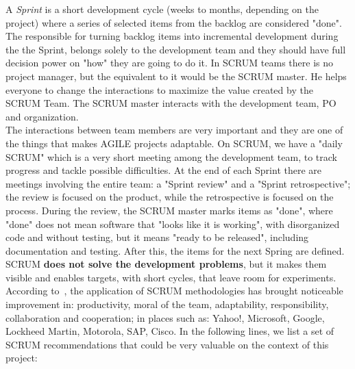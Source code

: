 \documentclass[11pt]{article} %
\begin{document}
A \emph{Sprint} is a short development cycle (weeks to months, depending on the project) where a series of selected items from the backlog are considered "done". The responsible for turning backlog items into incremental development during the the Sprint, belongs solely to the development team and they should have full decision power on "how" they are going to do it. In SCRUM teams there is no project manager, but the equivalent to it would be the SCRUM master. He helps everyone to change the interactions to maximize the value created by the SCRUM Team. The SCRUM master interacts with the development team, PO and organization.\\
The interactions between team members are very important and they are one of the things that makes AGILE projects adaptable. On SCRUM, we have a "daily SCRUM" which is a very short meeting among the development team, to track progress and tackle possible difficulties. At the end of each Sprint there are meetings involving the entire team:  a "Sprint review" and a "Sprint retrospective"; the review is focused on the product, while the retrospective is focused on the process. During the review, the SCRUM master marks items as "done", where "done" does not mean software that "looks like it is working", with disorganized code and without testing, but it means "ready to be released", including documentation and testing. After this, the items for the next Spring are defined.\\
SCRUM \textbf{does not solve the development problems}, but it makes them visible and enables targets, with short cycles, that leave room for experiments.\\
According to~\cite{primer}, the application of SCRUM methodologies has brought noticeable improvement in: productivity, moral of the team, adaptability, responsibility, collaboration and cooperation; in places such as: Yahoo!, Microsoft, Google, Lockheed Martin, Motorola, SAP, Cisco. In the following lines, we list a set of SCRUM recommendations that could be very valuable on the context of this project:
\end{document}
